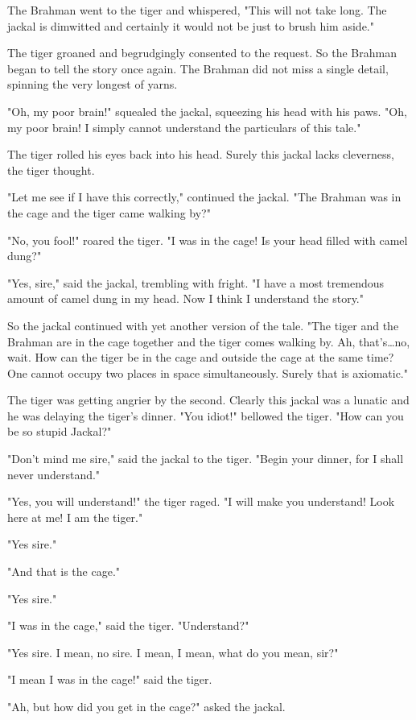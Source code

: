 The Brahman went to the tiger and whispered, "This will not take long. The jackal is dimwitted and certainly it would not be just to brush him aside."

The tiger groaned and begrudgingly consented to the request. So the Brahman began to tell the story once again. The Brahman did not miss a single detail, spinning the very longest of yarns.

"Oh, my poor brain!" squealed the jackal, squeezing his head with his paws. "Oh, my poor brain! I simply cannot understand the particulars of this tale."

The tiger rolled his eyes back into his head. Surely this jackal lacks cleverness, the tiger thought.

"Let me see if I have this correctly," continued the jackal. "The Brahman was in the cage and the tiger came walking by?"

"No, you fool!" roared the tiger. "I was in the cage! Is your head filled with camel dung?"

"Yes, sire," said the jackal, trembling with fright. "I have a most tremendous amount of camel dung in my head. Now I think I understand the story."

So the jackal continued with yet another version of the tale. "The tiger and the Brahman are in the cage together and the tiger comes walking by. Ah, that's\dots no, wait. How can the tiger be in the cage and outside the cage at the same time? One cannot occupy two places in space simultaneously. Surely that is axiomatic."

The tiger was getting angrier by the second. Clearly this jackal was a lunatic and he was delaying the tiger's dinner. "You idiot!" bellowed the tiger. "How can you be so stupid Jackal?"

"Don't mind me sire," said the jackal to the tiger. "Begin your dinner, for I shall never understand."

"Yes, you will understand!" the tiger raged. "I will make you understand! Look here at me! I am the tiger."

"Yes sire."

"And that is the cage."

"Yes sire."

"I was in the cage," said the tiger. "Understand?"

"Yes sire. I mean, no sire. I mean, I mean, what do you mean, sir?"

"I mean I was in the cage!" said the tiger.

"Ah, but how did you get in the cage?" asked the jackal.

